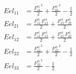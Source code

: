 \begin{align}
Eel_{11} &= \frac{{F_{11}^{\mathrm{el}}}^2}{2}+\frac{{F_{21}^{\mathrm{el}}}^2}{2}-\frac{1}{2} \\ 
Eel_{21} &= \frac{F_{11}^{\mathrm{el}}\,F_{12}^{\mathrm{el}}}{2}+\frac{F_{21}^{\mathrm{el}}\,F_{22}^{\mathrm{el}}}{2} \\ 
Eel_{12} &= \frac{F_{11}^{\mathrm{el}}\,F_{12}^{\mathrm{el}}}{2}+\frac{F_{21}^{\mathrm{el}}\,F_{22}^{\mathrm{el}}}{2} \\ 
Eel_{22} &= \frac{{F_{12}^{\mathrm{el}}}^2}{2}+\frac{{F_{22}^{\mathrm{el}}}^2}{2}-\frac{1}{2} \\ 
Eel_{33} &= \frac{{F_{33}^{\mathrm{el}}}^2}{2}-\frac{1}{2} 
\end{align}
